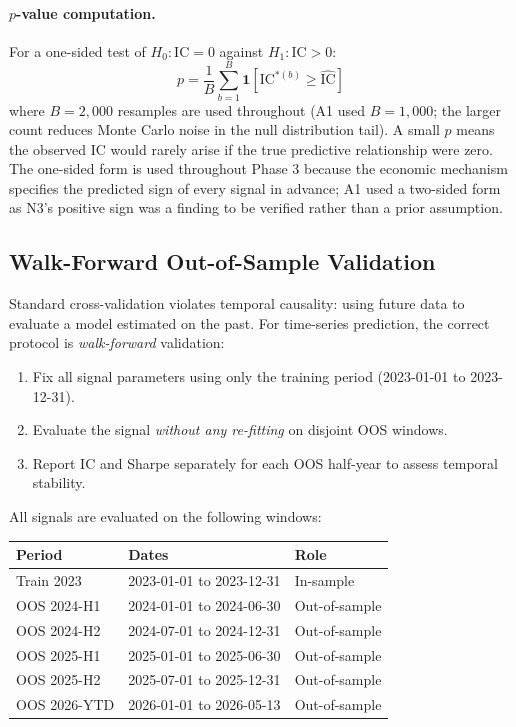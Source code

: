 \documentclass[12pt, a4paper]{article}
\theoremstyle{plain}
\theoremstyle{definition}
\newcommand{\IC}{\mathrm{IC}}
\begin{document}
\paragraph{$p$-value computation.}
For a one-sided test of $H_0 : \IC = 0$ against $H_1 : \IC > 0$:
\begin{equation}
  p = \frac{1}{B}\sum_{b=1}^B \mathbf{1}\!\left[\IC^{*(b)} \geq \widehat{\IC}\right]
  \label{eq:pvalue}
\end{equation}
where $B = 2{,}000$ resamples are used throughout (A1 used $B = 1{,}000$;
the larger count reduces Monte Carlo noise in the null distribution tail).
A small $p$ means the observed IC would rarely arise if the true predictive
relationship were zero.  The one-sided form is used throughout Phase 3
because the economic mechanism specifies the predicted sign of every signal
in advance; A1 used a two-sided form as N3's positive sign was a finding
to be verified rather than a prior assumption.

\subsection{Walk-Forward Out-of-Sample Validation}
\label{sec:walkforward}

Standard cross-validation violates temporal causality: using future data to
evaluate a model estimated on the past.  For time-series prediction, the
correct protocol is \emph{walk-forward} validation:
\begin{enumerate}[noitemsep]
  \item Fix all signal parameters using only the training period
        (2023-01-01 to 2023-12-31).
  \item Evaluate the signal \emph{without any re-fitting} on disjoint
        OOS windows.
  \item Report IC and Sharpe separately for each OOS half-year to
        assess temporal stability.
\end{enumerate}

All signals are evaluated on the following windows:

\begin{center}
\begin{tabular}{lll}
\toprule
Period & Dates & Role \\
\midrule
Train 2023   & 2023-01-01 to 2023-12-31 & In-sample \\
OOS 2024-H1  & 2024-01-01 to 2024-06-30 & Out-of-sample \\
OOS 2024-H2  & 2024-07-01 to 2024-12-31 & Out-of-sample \\
OOS 2025-H1  & 2025-01-01 to 2025-06-30 & Out-of-sample \\
OOS 2025-H2  & 2025-07-01 to 2025-12-31 & Out-of-sample \\
OOS 2026-YTD & 2026-01-01 to 2026-05-13 & Out-of-sample \\
\bottomrule
\end{tabular}
\end{center}
\end{document}
